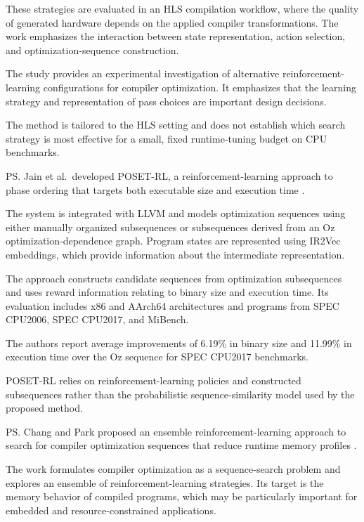 These strategies are evaluated in an HLS compilation workflow, where the quality of generated hardware depends on the applied compiler transformations. The work emphasizes the interaction between state representation, action selection, and optimization-sequence construction.

\re{} The study provides an experimental investigation of alternative reinforcement-learning configurations for compiler optimization. It emphasizes that the learning strategy and representation of pass choices are important design decisions.

\rg{} The method is tailored to the HLS setting and does not establish which search strategy is most effective for a small, fixed runtime-tuning budget on CPU benchmarks.

\ps{} Jain et al.\ developed POSET-RL, a reinforcement-learning approach to phase ordering that targets both executable size and execution time \cite{jain2022poset}.

\me{} The system is integrated with LLVM and models optimization sequences using either manually organized subsequences or subsequences derived from an Oz optimization-dependence graph. Program states are represented using IR2Vec embeddings, which provide information about the intermediate representation.

The approach constructs candidate sequences from optimization subsequences and uses reward information relating to binary size and execution time. Its evaluation includes x86 and AArch64 architectures and programs from SPEC CPU2006, SPEC CPU2017, and MiBench.

\re{} The authors report average improvements of 6.19\% in binary size and 11.99\% in execution time over the Oz sequence for SPEC CPU2017 benchmarks.

\rg{} POSET-RL relies on reinforcement-learning policies and constructed subsequences rather than the probabilistic sequence-similarity model used by the proposed method.

\ps{} Chang and Park proposed an ensemble reinforcement-learning approach to search for compiler optimization sequences that reduce runtime memory profiles \cite{chang2023ensemble}.

\me{} The work formulates compiler optimization as a sequence-search problem and explores an ensemble of reinforcement-learning strategies. Its target is the memory behavior of compiled programs, which may be particularly important for embedded and resource-constrained applications.

